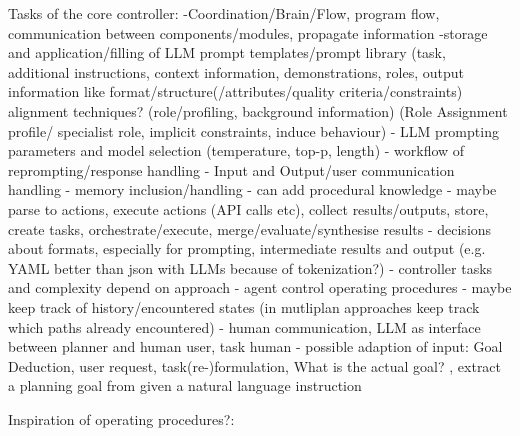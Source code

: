\documentclass{article}
\begin{document}
Tasks of the core controller: 
-Coordination/Brain/Flow, program flow, communication between components/modules, propagate information
-storage and application/filling of LLM prompt templates/prompt library (task, additional instructions, context information, demonstrations, roles, output information like format/structure(/attributes/quality criteria/constraints) alignment techniques? (role/profiling, background information) (Role Assignment
profile/ specialist role, implicit constraints, induce behaviour)
- LLM prompting parameters and model selection (temperature, top-p, length)
- workflow of reprompting/response handling
- Input and Output/user communication handling
- memory inclusion/handling
- can add procedural knowledge
-  maybe parse to actions, execute actions (API calls etc), collect results/outputs, store, create tasks, orchestrate/execute, merge/evaluate/synthesise results
- decisions about formats, especially for prompting, intermediate results and output (e.g. YAML better than json with LLMs because of tokenization?)
- controller tasks and complexity depend on approach
- agent control operating procedures
- maybe keep track of history/encountered states (in mutliplan approaches keep track which paths already encountered)
- human communication, LLM as interface between planner and human user, task human
- possible adaption of input: Goal Deduction, user request, task(re-)formulation, What is the actual goal? , extract a planning goal from given a natural language instruction

Inspiration of operating procedures?: 

\end{document}
